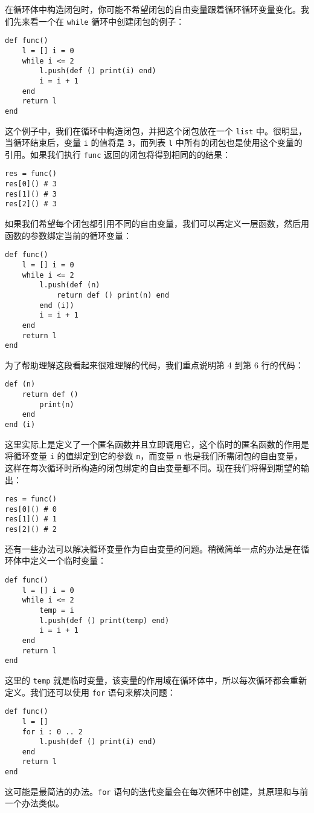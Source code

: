 在循环体中构造闭包时，你可能不希望闭包的自由变量跟着循环循环变量变化。我们先来看一个在 \texttt{while} 循环中创建闭包的例子：
\begin{lstlisting}[language=berry]
def func()
    l = [] i = 0
    while i <= 2
        l.push(def () print(i) end)
        i = i + 1
    end
    return l
end
\end{lstlisting}
这个例子中，我们在循环中构造闭包，并把这个闭包放在一个 \texttt{list} 中。很明显，当循环结束后，变量 \texttt{i} 的值将是 \texttt{3}，而列表 \texttt{l} 中所有的闭包也是使用这个变量的引用。如果我们执行 \texttt{func} 返回的闭包将得到相同的的结果：
\begin{lstlisting}[language=berry]
res = func()
res[0]() # 3
res[1]() # 3
res[2]() # 3
\end{lstlisting}
如果我们希望每个闭包都引用不同的自由变量，我们可以再定义一层函数，然后用函数的参数绑定当前的循环变量：
\begin{lstlisting}[language=berry]
def func()
    l = [] i = 0
    while i <= 2
        l.push(def (n)
            return def () print(n) end
        end (i))
        i = i + 1
    end
    return l
end
\end{lstlisting}
为了帮助理解这段看起来很难理解的代码，我们重点说明第 4 到第 6 行的代码：
\begin{lstlisting}[language=berry]
def (n)
    return def ()
        print(n)
    end
end (i)
\end{lstlisting}
这里实际上是定义了一个匿名函数并且立即调用它，这个临时的匿名函数的作用是将循环变量 \texttt{i} 的值绑定到它的参数 \texttt{n}，而变量 \texttt{n} 也是我们所需闭包的自由变量，这样在每次循环时所构造的闭包绑定的自由变量都不同。现在我们将得到期望的输出：
\begin{lstlisting}[language=berry]
res = func()
res[0]() # 0
res[1]() # 1
res[2]() # 2
\end{lstlisting}
还有一些办法可以解决循环变量作为自由变量的问题。稍微简单一点的办法是在循环体中定义一个临时变量：
\begin{lstlisting}[language=berry]
def func()
    l = [] i = 0
    while i <= 2
        temp = i
        l.push(def () print(temp) end)
        i = i + 1
    end
    return l
end
\end{lstlisting}
这里的 \texttt{temp} 就是临时变量，该变量的作用域在循环体中，所以每次循环都会重新定义。我们还可以使用 \texttt{for} 语句来解决问题：
\begin{lstlisting}[language=berry]
def func()
    l = []
    for i : 0 .. 2
        l.push(def () print(i) end)
    end
    return l
end
\end{lstlisting}
这可能是最简洁的办法。\texttt{for} 语句的迭代变量会在每次循环中创建，其原理和与前一个办法类似。

